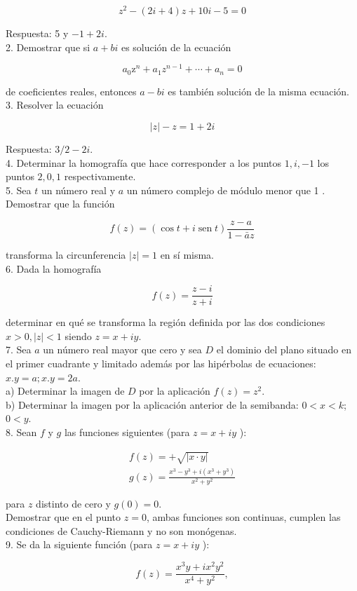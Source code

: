 \documentclass[10pt]{article}
\theoremstyle{plain}
\theoremstyle{definition}
\theoremstyle{remark}
\begin{document}
$$
z^{2}-(2 i+4) z+10 i-5=0
$$

Respuesta: 5 y $-1+2 i$.\\
2. Demostrar que si $a+b i$ es solución de la ecuación

$$
a_{0} \mathrm{z}^{n}+a_{1} z^{n-1}+\cdots+a_{n}=0
$$

de coeficientes reales, entonces $a-b i$ es también solución de la misma ecuación.\\
3. Resolver la ecuación

$$
|z|-z=1+2 i
$$

Respuesta: $3 / 2-2 i$.\\
4. Determinar la homografía que hace corresponder a los puntos $1, i,-1$ los puntos $2,0,1$ respectivamente.\\
5. Sea $t$ un número real y $a$ un número complejo de módulo menor que 1 . Demostrar que la función

$$
f(z)=(\cos t+i \operatorname{sen} t) \frac{z-a}{1-\bar{a} z}
$$

transforma la circunferencia $|z|=1$ en sí misma.\\
6. Dada la homografía

$$
f(z)=\frac{z-i}{z+i}
$$

determinar en qué se transforma la región definida por las dos condiciones $x>0,|z|<1$ siendo $z=x+i y$.\\
7. Sea $a$ un número real mayor que cero y sea $D$ el dominio del plano situado en el primer cuadrante y limitado además por las hipérbolas de ecuaciones: $x . y=a ; x . y=2 a$.\\
a) Determinar la imagen de $D$ por la aplicación $f(z)=z^{2}$.\\
b) Determinar la imagen por la aplicación anterior de la semibanda: $0<x<k$; $0<y$.\\
8. Sean $f$ y $g$ las funciones siguientes (para $z=x+i y$ ):

$$
\begin{gathered}
f(z)=+\sqrt{|x \cdot y|} \\
g(z)=\frac{x^{3}-y^{3}+i\left(x^{3}+y^{3}\right)}{x^{2}+y^{2}}
\end{gathered}
$$

para $z$ distinto de cero y $g(0)=0$.\\
Demostrar que en el punto $z=0$, ambas funciones son continuas, cumplen las condiciones de Cauchy-Riemann y no son monógenas.\\
9. Se da la siguiente función (para $z=x+i y$ ):

$$
f(z)=\frac{x^{3} y+i x^{2} y^{2}}{x^{4}+y^{2}},
$$
\end{document}
